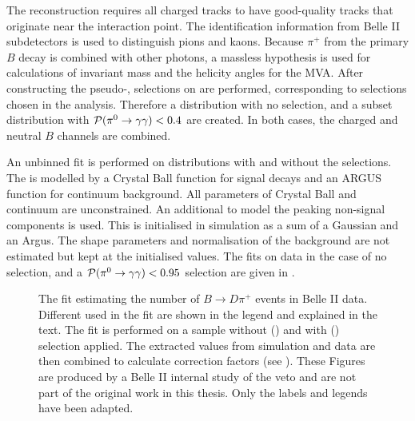 The reconstruction requires all charged tracks to have good-quality tracks that originate near the interaction point.
The identification information from Belle II subdetectors is used to distinguish pions and kaons.
Because $\pi^+$ from the primary $B$ decay is combined with other photons, a massless hypothesis is used for calculations of invariant mass and the helicity angles for the MVA.
After constructing the pseudo-\piz, selections on \piVeto are performed, corresponding to selections chosen in the analysis.
Therefore a distribution with no \piVeto selection, and a subset distribution with ${\mathcal{P}(\pi^0\rightarrow\gamma\gamma)}<0.4$ are created.
In both cases, the charged and neutral $B$ channels are combined.

An unbinned \Mbc fit is performed on distributions with and without the \piVeto selections.
The \Mbc is modelled by a Crystal Ball function for signal decays and an ARGUS function for continuum background.
All parameters of Crystal Ball and continuum are unconstrained.
An additional \PDF to model the peaking non-signal \BB components is used.
This \PDF is initialised in simulation as a sum of a Gaussian and an Argus.
The shape parameters and normalisation of the \BB background \PDF are not estimated but kept at the initialised values.
The fits on data in the case of no \piVeto selection, and a ${\mathcal{P}(\pi^0\rightarrow\gamma\gamma)}<0.95$ selection are given in .
\begin{figure}[htbp!]
    \centering
    \caption{\label{fig:pivetofit} The fit estimating the number of $B\to D \pi^+$ events in Belle II data.
    Different  used in the fit are shown in the legend and explained in the text.
    The fit is performed on a sample without () and with () \piVeto selection applied.
    The extracted values from simulation and data are then combined to calculate \piVeto correction factors (see ).
    These Figures are produced by a Belle II internal study of the \piz veto and are not part of the original work in this thesis.
    Only the labels and legends have been adapted.    
    }
\end{figure}

